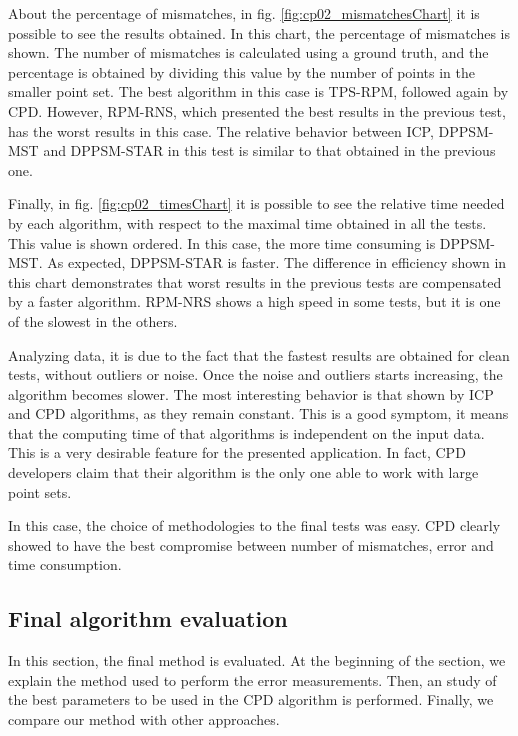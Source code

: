 About the percentage of mismatches, in fig. \ref{fig:cp02_mismatchesChart} it is possible to see the results obtained. In 
this chart, the percentage of mismatches is shown. The number of mismatches is calculated using a ground truth, and the 
percentage is obtained by dividing this value by the number of points in the smaller point set. The best algorithm in 
this case is TPS-RPM, followed again by CPD. However, RPM-RNS, which presented the best results in the previous test, 
has the worst results in this case. The relative behavior between ICP, DPPSM-MST and DPPSM-STAR in this test is 
similar to that obtained in the previous one.

Finally, in fig. \ref{fig:cp02_timesChart} it is possible to see the relative time needed by each algorithm, with respect to 
the maximal time obtained in all the tests. This value is shown ordered. In this case, the more time consuming is 
DPPSM-MST. As expected, DPPSM-STAR is faster. The difference in efficiency shown in this chart demonstrates that worst 
results in the previous tests are compensated by a faster algorithm. RPM-NRS shows a high speed in some tests, but it is 
one of the slowest in the others. 

Analyzing data, it is due to the fact that the fastest results are obtained for clean 
tests, without outliers or noise. Once the noise and outliers starts increasing, the algorithm becomes slower.
The most interesting behavior is that shown by ICP and CPD algorithms, as they remain constant. This is a good 
symptom, it means that the computing time of that algorithms is independent on the input data. This is a very desirable 
feature for the presented application. In fact, CPD developers \cite{myronenko2010point} claim that their algorithm is 
the only one able to work with large point sets.

In this case, the choice of methodologies to the final tests was easy. CPD clearly showed to have the best compromise 
between number of mismatches, error and time consumption.

\subsection{Final algorithm evaluation}\label{ch:chapter02_02_03}

In this section, the final method is evaluated. At the beginning of the section, we explain the method used to perform the error measurements. Then, an study of the best parameters to be used in the CPD algorithm is performed. Finally, we compare our method with other approaches.

